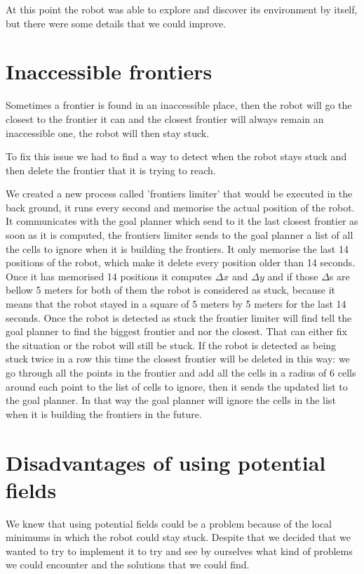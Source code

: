 At this point the robot was able to explore and discover its environment by itself, but there were some details that we could improve.

\section{Inaccessible frontiers}

Sometimes a frontier is found in an inaccessible place, then the robot will go the closest to the frontier it can and the closest frontier will always remain an inaccessible one, the robot will then stay stuck.

To fix this issue we had to find a way to detect when the robot stays stuck and then delete the frontier that it is trying to reach.

We created a new process called 'frontiers limiter' that would be executed in the back ground, it runs every second and memorise the actual position of the robot.
It communicates with the goal planner which send to it the last closest frontier as soon as it is computed, the frontiers limiter sends to the goal planner a list of all the cells to ignore when it is building the frontiers.
It only memorise the last 14 positions of the robot, which make it delete every position older than 14 seconds.
Once it has memorised 14 positions it computes $\Delta x$ and $\Delta y$ and if those $\Delta$s are bellow 5 meters for both of them the robot is considered as stuck, because it means that the robot stayed in a square of 5 meters by 5 meters for the last 14 seconds.
Once the robot is detected as stuck the frontier limiter will find tell the goal planner to find the biggest frontier and nor the closest.
That can either fix the situation or the robot will still be stuck.
If the robot is detected as being stuck twice in a row this time the closest frontier will be deleted in this way: we go through all the points in the frontier and add all the cells in a radius of 6 cells around each point to the list of cells to ignore, then it sends the updated list to the goal planner.
In that way the goal planner will ignore the cells in the list when it is building the frontiers in the future.

\section{Disadvantages of using potential fields}

We knew that using potential fields could be a problem because of the local minimums in which the robot could stay stuck.
Despite that we decided that we wanted to try to implement it to try and see by ourselves what kind of problems we could encounter and the solutions that we could find.

